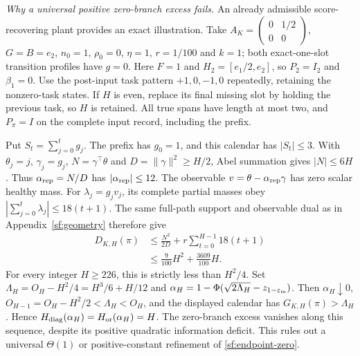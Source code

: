 \documentclass[journal]{IEEEtran}
\begin{document}
\par\smallskip\noindent\emph{Why a universal positive zero-branch excess fails.}
An already admissible score-recovering plant provides an exact illustration.
Take $A_K=\left(\begin{smallmatrix}0&1/2\\0&0\end{smallmatrix}\right)$,
$G=B=e_2$, $n_0=1$, $\rho_0=0$, $\eta=1$, $r=1/100$ and $k=1$;
both exact-one-slot transition profiles have $g=0$.
Here $F=1$ and $H_2=[e_1/2,e_2]$, so $P_2=I_2$ and $\beta_1=0$.
Use the post-input task pattern $+1,0,-1,0$ repeatedly, retaining the
nonzero-task states. If $H$ is even, replace its final missing slot by
holding the previous task, so $H$ is retained. All true spans have length
at most two, and $P_\pi=I$ on the complete input record, including the prefix.

Put $S_t=\sum_{j=0}^t g_j$. The prefix has $g_0=1$, and this calendar
has $|S_t|\le3$. With $\theta_j=j$, $\gamma_j=g_j$,
$N=\gamma^\top\theta$ and $D=\|\gamma\|^2\ge H/2$, Abel summation gives
$|N|\le6H$. Thus $\alpha_{\rm rep}=N/D$ has $|\alpha_{\rm rep}|\le12$.
The observable $v=\theta-\alpha_{\rm rep}\gamma$ has zero scalar healthy mass.
For $\lambda_j=g_jv_j$, its complete partial masses obey
$|\sum_{j=0}^t\lambda_j|\le18(t+1)$.
The same full-path support and observable dual as in
Appendix~\ref{sf:geometry} therefore give
\begin{equation}\label{sf:endpoint-rounding-example}
\begin{aligned}
D_{K,H}(\pi)
 &\le\frac{N^2}{2D}+r\sum_{t=0}^{H-1}18(t+1)\\
 &\le\frac9{100}H^2+\frac{3609}{100}H.
\end{aligned}
\end{equation}
For every integer $H\ge226$, this is strictly less than $H^2/4$.
Set $\Lambda_H=O_H-H^2/4=H^3/6+H/12$ and
$\alpha_H=1-\Phi(\sqrt{2\Lambda_H}-z_{1-\varepsilon_{\rm m}})$.
Then $\alpha_H\downarrow0$,
$O_{H-1}=O_H-H^2/2<\Lambda_H<O_H$, and the displayed calendar has
$G_{K,H}(\pi)>\Lambda_H$. Hence
$H_{\rm diag}(\alpha_H)=H_{\rm or}(\alpha_H)=H$.
The zero-branch excess vanishes along this sequence, despite its positive
quadratic information deficit. This rules out a universal $\Theta(1)$
or positive-constant refinement of \eqref{sf:endpoint-zero}.
\end{document}

